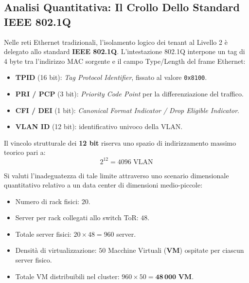 \documentclass[11pt, a4paper]{article}
\begin{document}
\subsection{Analisi Quantitativa: Il Crollo Dello Standard IEEE 802.1Q}
Nelle reti Ethernet tradizionali, l'isolamento logico dei tenant al Livello 2 è delegato allo standard \textbf{IEEE 802.1Q}. L'intestazione 802.1Q interpone un tag di 4 byte tra l'indirizzo MAC sorgente e il campo Type/Length del frame Ethernet:
\begin{itemize}[noitemsep]
    \item \textbf{TPID} (16 bit): \emph{Tag Protocol Identifier}, fissato al valore \texttt{0x8100}.
    \item \textbf{PRI / PCP} (3 bit): \emph{Priority Code Point} per la differenziazione del traffico.
    \item \textbf{CFI / DEI} (1 bit): \emph{Canonical Format Indicator / Drop Eligible Indicator}.
    \item \textbf{VLAN ID} (12 bit): identificativo univoco della VLAN.
\end{itemize}


Il vincolo strutturale dei \textbf{12 bit} riserva uno spazio di indirizzamento massimo teorico pari a:
\[
2^{12} = 4096 \text{ VLAN}
\]


Si valuti l'inadeguatezza di tale limite attraverso uno scenario dimensionale quantitativo relativo a un data center di dimensioni medio-piccole:
\begin{itemize}[noitemsep]
    \item Numero di rack fisici: $20$.
    \item Server per rack collegati allo switch ToR: $48$.
    \item Totale server fisici: $20 \times 48 = 960$ server.
    \item Densità di virtualizzazione: $50$ Macchine Virtuali (\textbf{VM}) ospitate per ciascun server fisico.
    \item Totale VM distribuibili nel cluster: $960 \times 50 = \mathbf{48\,000 \text{ VM}}$.
\end{itemize}
\end{document}
